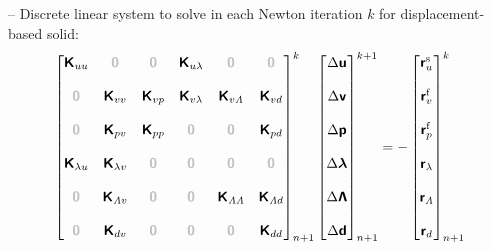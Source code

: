 \documentclass[a4paper,12pt]{report}
\newcommand{\bs}[1]{\boldsymbol{#1}}
\newcommand{\zerom}{\textcolor{lightgray}{\bs{\mathsf{0}}}}
\newcommand{\ROP}{\bs{\mathsf{r}}}
\newcommand{\LM}{\bs{\mathsf{\lambda}}}
\newcommand{\LMZ}{\bs{\mathsf{\Lambda}}}
\newcommand{\lmi}{\lambda} %
\newcommand{\lmzi}{\mathit{\Lambda}} %
\begin{document}
-- Discrete linear system to solve in each Newton iteration $k$ for displacement-based solid:
\begin{equation}
\label{equation-lin-sys-fsi-0d}
\begin{aligned}
\begin{bmatrix} \boldsymbol{\mathsf{K}}_{uu} & \zerom & \zerom & \boldsymbol{\mathsf{K}}_{u\lmi} & \zerom & \zerom \\ \\ \zerom & \boldsymbol{\mathsf{K}}_{vv} & \boldsymbol{\mathsf{K}}_{vp} & \boldsymbol{\mathsf{K}}_{v\lmi} & \boldsymbol{\mathsf{K}}_{v\lmzi} & \boldsymbol{\mathsf{K}}_{vd} \\ \\ \zerom & \boldsymbol{\mathsf{K}}_{pv} & \boldsymbol{\mathsf{K}}_{pp} & \zerom & \zerom & \boldsymbol{\mathsf{K}}_{pd} \\ \\ \boldsymbol{\mathsf{K}}_{\lmi u} & \boldsymbol{\mathsf{K}}_{\lmi v} & \zerom & \zerom & \zerom & \zerom \\ \\ \zerom & \boldsymbol{\mathsf{K}}_{\lmzi v} & \zerom & \zerom & \boldsymbol{\mathsf{K}}_{\lmzi \lmzi} & \boldsymbol{\mathsf{K}}_{\lmzi d} \\ \\ \zerom &  \boldsymbol{\mathsf{K}}_{dv}  & \zerom & \zerom & \zerom & \boldsymbol{\mathsf{K}}_{dd} \end{bmatrix}_{n+1}^{k}\begin{bmatrix} \Delta\boldsymbol{\mathsf{u}} \\ \\ \Delta\boldsymbol{\mathsf{v}} \\ \\ \Delta\boldsymbol{\mathsf{p}} \\ \\ \Delta\LM \\ \\ \Delta\LMZ \\ \\ \Delta\boldsymbol{\mathsf{d}} \end{bmatrix}_{n+1}^{k+1}=-\begin{bmatrix} \ROP_{u}^{\mathrm{s}} \\ \\ \ROP_{v}^{\mathrm{f}} \\ \\ \ROP_{p}^{\mathrm{f}} \\ \\ \ROP_{\lmi} \\ \\ \ROP_{\lmzi} \\ \\ \ROP_{d}\end{bmatrix}_{n+1}^{k}
\end{aligned}
\end{equation}
\end{document}
